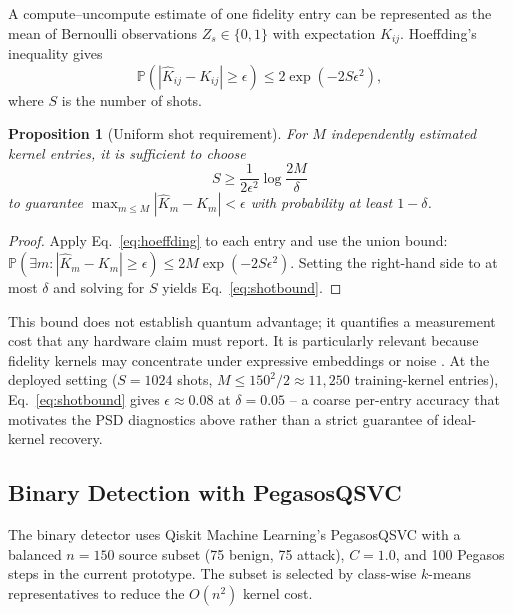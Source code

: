 \documentclass[conference]{IEEEtran}
\newtheorem{proposition}{Proposition}
\begin{document}
A compute--uncompute estimate of one fidelity entry can be represented as
the mean of Bernoulli observations $Z_s \in \{0,1\}$ with expectation
$K_{ij}$. Hoeffding's inequality gives
\begin{equation}
\mathbb{P}\left(|\hat{K}_{ij} - K_{ij}| \geq \epsilon\right) \leq 2
\exp(-2S\epsilon^2),
\label{eq:hoeffding}
\end{equation}
where $S$ is the number of shots.

\begin{proposition}[Uniform shot requirement]
For $M$ independently estimated kernel entries, it is sufficient to
choose
\begin{equation}
S \geq \frac{1}{2\epsilon^2} \log \frac{2M}{\delta}
\label{eq:shotbound}
\end{equation}
to guarantee $\max_{m \leq M} |\hat{K}_m - K_m| < \epsilon$ with
probability at least $1-\delta$.
\end{proposition}
\begin{proof}
Apply Eq.~\eqref{eq:hoeffding} to each entry and use the union bound:
$\mathbb{P}(\exists m: |\hat{K}_m - K_m| \geq \epsilon) \leq 2M
\exp(-2S\epsilon^2)$. Setting the right-hand side to at most $\delta$ and
solving for $S$ yields Eq.~\eqref{eq:shotbound}.
\end{proof}

This bound does not establish quantum advantage; it quantifies a
measurement cost that any hardware claim must report. It is particularly
relevant because fidelity kernels may concentrate under expressive
embeddings or noise \cite{thanasilp2024}. At the deployed setting
($S=1024$ shots, $M \leq 150^2/2 \approx 11{,}250$ training-kernel
entries), Eq.~\eqref{eq:shotbound} gives $\epsilon \approx 0.08$ at
$\delta=0.05$ -- a coarse per-entry accuracy that motivates the PSD
diagnostics above rather than a strict guarantee of ideal-kernel
recovery.

\subsection{Binary Detection with PegasosQSVC}

The binary detector uses Qiskit Machine Learning's PegasosQSVC
\cite{qiskit_ml} with a balanced $n=150$ source subset (75 benign, 75
attack), $C=1.0$, and 100 Pegasos steps in the current prototype. The
subset is selected by class-wise $k$-means representatives to reduce the
$O(n^2)$ kernel cost.
\end{document}

